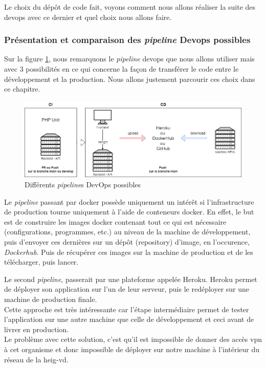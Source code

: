 \documentclass[
    iai, %
    il, %
]{heig-tb}
\begin{document}
Le choix du dépôt de code fait, voyons comment nous allons réaliser la suite des \Gls{devops} avec ce dernier et quel choix nous allons faire.

\subsubsection{Présentation et comparaison des \emph{pipeline} Devops possibles}

Sur la figure \ref{devops-choix.drawio}, nous remarquons le \emph{pipeline} \Gls{devops} que nous allons utiliser mais avec 3 possibilités en ce qui concerne la façon de transférer le code entre le développement et la production. Nous allons justement parcourir ces choix dans ce chapitre.

\begin{center}
    \begin{figure}
        \includegraphics[width=\textwidth]{./assets/figures/devops-choix.drawio.png}
        \caption{Différents \emph{pipeline}s DevOps possibles \label{devops-choix.drawio}}
    \end{figure}
\end{center}

Le \emph{pipeline} passant par \Gls{docker} possède uniquement un intérêt si l'infrastructure de production tourne uniquement à l'aide de \Gls{conteneur}s \Gls{docker}. En effet, le but est de construire les images \Gls{docker} contenant tout ce qui est nécessaire (configurations, programmes, etc.) au niveau de la machine de développement, puis d'envoyer ces dernières sur un dépôt (\Gls{repository}) d'image, en l'occurence, \emph{Dockerhub}. Puis de
récupérer ces images sur la machine de production et de les télécharger, puis lancer.

Le second \emph{pipeline}, passerait par une plateforme appelée Heroku. Heroku permet de déployer son application sur l'un de leur serveur, puis le redéployer sur une machine de production finale.\\
Cette approche est très intéressante car l'étape intermédiaire permet de tester l'application sur une autre machine que celle de développement et ceci avant de livrer en production.\\
Le problème avec cette solution, c'est qu'il est impossible de donner des accès \Gls{vpn} à cet organisme et donc impossible de déployer sur notre machine à l'intérieur du réseau de la \Gls{heig-vd}.
\end{document}

